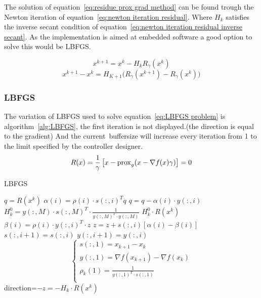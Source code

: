 			The solution of equation~\ref{eq:residue prox grad method} can be found trough the Newton iteration of equation~\ref{eq:newton iteration residual}. Where $H_k$ satisfies the inverse secant condition of equation~\ref{eq:newton iteration residual inverse secant}. As the implementation is aimed at embedded software a good option to solve this would be LBFGS.
			
			\begin{equation}
			x^{k+1} = x^k -H_kR_{\gamma}(x^k)
			\label{eq:newton iteration residual}
			\end{equation}
			\begin{equation}
			x^{k+1} - x^k = H_{K+1} \Big( R_{\gamma}(x^{k+1})- R_{\gamma}(x^k) \Big)
			\label{eq:newton iteration residual inverse secant}
			\end{equation}
		\subsubsection{LBFGS}
			The variation of LBFGS used to solve equation~\ref{eq:LBFGS problem} is algorithm~\ref{alg:LBFGS}, the first iteration is not displayed.(the direction is equal to the gradient) And the current\ buffersize will increase every iteration from 1 to the limit specified by the controller designer.
			\begin{equation}
				R(x) = \frac{1}{\gamma}\left[ x - \operatorname{prox}_g( x - \nabla f(x)\gamma) \right] = 0
				\label{eq:LBFGS problem}
			\end{equation}
			\begin{algorithm}
				\caption{LBFGS}
				\label{alg:LBFGS}
				\begin{algorithmic}[1]
					\State $q = R(x^k)$
						\State $\alpha(i)=\rho(i) \cdot s(:,i)^Tq$
						\State $q = q - \alpha(i) \cdot y(:,i)$
					\EndFor
					\State $H_k^0 = y(:,M) \cdot s(:,M)^T \cdot  \frac{1}{y(:,M)^T \cdot y(:,M)}$
					\State $H^0_k \cdot R(x^k)$
						\State $\beta(i) = \rho(i) \cdot y(:,i)^T \cdot z$
						\State $z = z + s(:,i)[\alpha(i)-\beta(i)]$
					\EndFor
						\State $s(:,i+1)=s(:,i)$
						\State $y(:,i+1)=y(:,i)$
					\EndFor
					\State $$\begin{cases}
								s(:,1) = x_{k+1} - x_k \\
								y(:,1) = \nabla f(x_{k+1}) - \nabla f(x_k)\\
								\rho_k(1) = \frac{1}{y(:,1)^T \cdot s(:,1)} \\ 
							\end{cases}
							$$
					\State \Return direction=$-z=-H_k \cdot R(x^k)$
					\EndProcedure
				\end{algorithmic}
			\end{algorithm}
		
